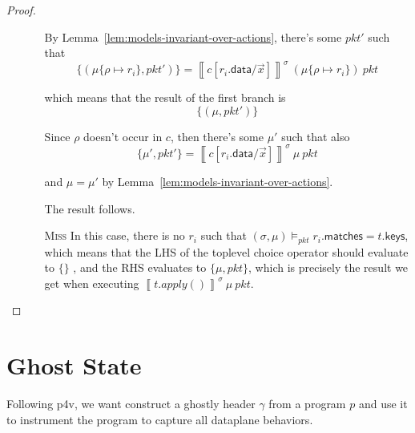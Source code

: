 \documentclass{article}
\newcommand{\pkt}{\mathit{pkt}}
\newcommand{\denote}[1]{\left\llbracket#1\right\rrbracket}
\newcommand{\matches}{\mathsf{matches}}
\newcommand{\keys}{\mathsf{keys}}
\newcommand{\data}{\mathsf{data}}
\newcommand{\satisfy}[3]{({#1,#3}) \models_{#2}}
\begin{document}
\begin{proof}
\begin{enumerate}[align=left]
\begin{enumerate}
      By Lemma~\ref{lem:models-invariant-over-actions}, there's some $\pkt'$ such that
      \[\{(\mu\{\rho \mapsto r_i\}, \pkt')\} =
      \denote{c[r_i.\data/\vec x]}^\sigma~(\mu\{\rho \mapsto r_i\})~\pkt
      \]

      which means that the result of the first branch is
      \[\{(\mu, \pkt')\} \]

      Since $\rho$ doesn't occur in $c$, then there's some $\mu'$ such that also
      \[\{\mu', \pkt'\} = \denote{c[r_i.\data/\vec x]}^\sigma~\mu~\pkt \]

      and $\mu = \mu'$ by Lemma~\ref{lem:models-invariant-over-actions}.

      The result follows.

    \item[\textsc{Miss}] In this case, there is no $r_i$ such that
      $\satisfy\sigma\pkt\mu r_i.\matches = t.\keys$, which means that the LHS
      of the toplevel choice operator should evaluate to $\{\}$ , and the RHS evaluates to $\{\mu,\pkt\}$, which
      is precisely the result we get when executing
      $\denote{t.apply()}^\sigma~\mu~\pkt$.

    \end{enumerate}

  \end{enumerate}
\end{proof}

\section{Ghost State}


Following p4v, we want construct a ghostly header $\gamma$ from a program $p$
and use it to instrument the program to capture all dataplane behaviors.
\end{document}
